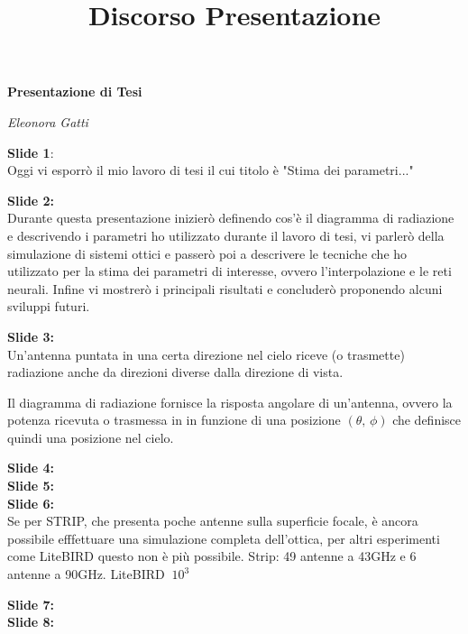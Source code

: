 \documentclass[12pt,a4paper,final]{report}			%
\title{Discorso Presentazione}
\begin{document}
\begin{center}
	\LARGE \textbf{Presentazione di Tesi}
\end{center}
\begin{center}
	\normalsize \textit{Eleonora Gatti}
\end{center}

\vspace{5mm}


\noindent \textbf{Slide 1}:\\
Oggi vi esporrò il mio lavoro di tesi il cui titolo è "Stima dei parametri..."

\vspace{3mm}
\noindent \textbf{Slide 2:}\\
Durante questa presentazione inizierò definendo cos'è il diagramma di radiazione e descrivendo i parametri ho utilizzato durante il lavoro di tesi, vi parlerò della simulazione di sistemi ottici e passerò poi a descrivere le tecniche che ho utilizzato per la stima dei parametri di interesse, ovvero l'interpolazione e le reti neurali. Infine vi mostrerò i principali risultati e concluderò proponendo alcuni sviluppi futuri.


\vspace{3mm}
\noindent \textbf{Slide 3:}\\
Un'antenna puntata in una certa direzione nel cielo riceve (o trasmette) radiazione anche da direzioni diverse dalla direzione di vista.

Il diagramma di radiazione fornisce la risposta angolare di un'antenna, ovvero la potenza ricevuta o trasmessa in in funzione di una posizione $(\theta,\,\phi)$ che definisce quindi una posizione nel cielo.

\vspace{3mm}
\noindent \textbf{Slide 4:}\\

\vspace{3mm}
\noindent \textbf{Slide 5:}\\

\vspace{3mm}
\noindent \textbf{Slide 6:}\\
Se per STRIP, che presenta poche antenne sulla superficie focale, è ancora possibile efffettuare una simulazione completa dell'ottica, per altri esperimenti come LiteBIRD questo non è più possibile. Strip: 49 antenne a 43GHz e 6 antenne a 90GHz. LiteBIRD $~10^3$

\vspace{3mm}
\noindent \textbf{Slide 7:}\\

\vspace{3mm}
\noindent \textbf{Slide 8:}\\
\end{document}
